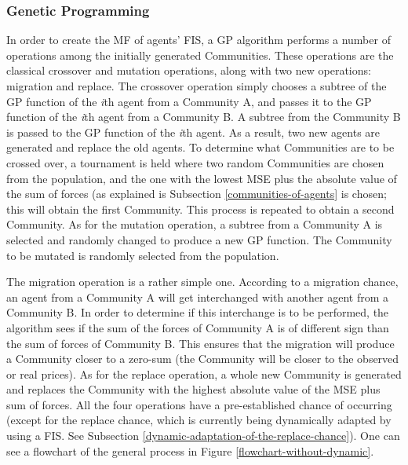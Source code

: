 \documentclass[12pt,journal,draftcls,onecolumn]{IEEEtran}
\begin{document}
\subsubsection{Genetic Programming}

In order to create the MF of agents' FIS, a GP algorithm performs a number of operations among the initially generated Communities. These operations are the classical crossover and mutation operations, along with two new operations: migration and replace. The crossover operation simply chooses a subtree of the GP function of the \textit{i}th agent from a Community A, and passes it to the GP function of the \textit{i}th agent from a Community B. A subtree from the Community B is passed to the GP function of the \textit{i}th agent. As a result, two new agents are generated and replace the old agents. To determine what Communities are to be crossed over, a tournament is held where two random Communities are chosen from the population, and the one with the lowest MSE plus the absolute value of the sum of forces (as explained is Subsection \ref{communities-of-agents} is chosen; this will obtain the first Community. This process is repeated to obtain a second Community. As for the mutation operation, a subtree from a Community A is selected and randomly changed to produce a new GP function. The Community to be mutated is randomly selected from the population.

The migration operation is a rather simple one. According to a
migration chance, an agent from a Community A will get interchanged
with another agent from a Community B. In order to determine if this
interchange is to be performed, the algorithm sees if the sum of the
forces of Community A is of different sign than the sum of forces of
Community B. This ensures that the migration will produce a Community
closer to a zero-sum (the Community will be closer to the observed or
real prices). As for the replace operation, a whole new Community is
generated and replaces the Community with the highest absolute value
of the MSE plus sum of forces. All the four operations have a
pre-established chance of occurring (except for the replace chance,
which is currently being dynamically adapted by using a FIS. See
Subsection \ref{dynamic-adaptation-of-the-replace-chance}). One can
see a flowchart of the general process in Figure
\ref{flowchart-without-dynamic}.
\end{document}
